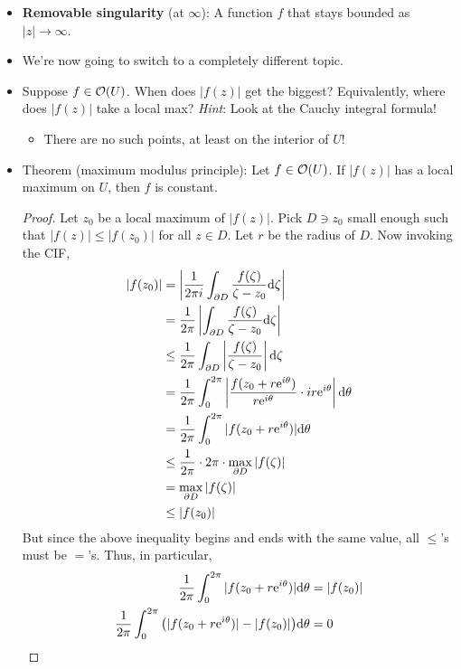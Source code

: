 \documentclass[../notes.tex]{subfiles}
\begin{document}
\begin{itemize}
    \item \textbf{Removable singularity} (at $\infty$): A function $f$ that stays bounded as $|z|\to\infty$.
    \item We're now going to switch to a completely different topic.
    \item Suppose $f\in\mO(U)$. When does $|f(z)|$ get the biggest? Equivalently, where does $|f(z)|$ take a local max? \emph{Hint}: Look at the Cauchy integral formula!
    \begin{itemize}
        \item There are no such points, at least on the interior of $U$!
    \end{itemize}
    \item Theorem (maximum modulus principle): Let $f\in\mO(U)$. If $|f(z)|$ has a local maximum on $U$, then $f$ is constant.
    \begin{proof}
        Let $z_0$ be a local maximum of $|f(z)|$. Pick $D\ni z_0$ small enough such that $|f(z)|\leq|f(z_0)|$ for all $z\in D$. Let $r$ be the radius of $D$. Now invoking the CIF,
        \begin{align*}
            |f(z_0)| &= \left| \frac{1}{2\pi i}\int_{\partial D}\frac{f(\zeta)}{\zeta-z_0}\dd\zeta \right|\\
            &= \frac{1}{2\pi}\left| \int_{\partial D}\frac{f(\zeta)}{\zeta-z_0}\dd\zeta \right|\\
            &\leq \frac{1}{2\pi}\int_{\partial D}\left| \frac{f(\zeta)}{\zeta-z_0} \right|\dd\zeta\\
            &= \frac{1}{2\pi}\int_0^{2\pi}\left| \frac{f(z_0+r\e[i\theta])}{r\e[i\theta]}\cdot ir\e[i\theta] \right|\dd\theta\\
            &= \frac{1}{2\pi}\int_0^{2\pi}|f(z_0+r\e[i\theta])|\dd\theta\\
            &\leq \frac{1}{2\pi}\cdot 2\pi\cdot\max_{\partial D}|f(\zeta)|\\
            &= \max_{\partial D}|f(\zeta)|\\
            &\leq |f(z_0)|
        \end{align*}
        But since the above inequality begins and ends with the same value, all $\leq$'s must be $=$'s. Thus, in particular,
        \begin{align*}
            \frac{1}{2\pi}\int_0^{2\pi}|f(z_0+r\e[i\theta])|\dd\theta &= |f(z_0)|\\
            \frac{1}{2\pi}\int_0^{2\pi}\big( |f(z_0+r\e[i\theta])|-|f(z_0)| \big)\dd\theta &= 0
        \end{align*}

\end{proof}
\end{itemize}
\end{document}
